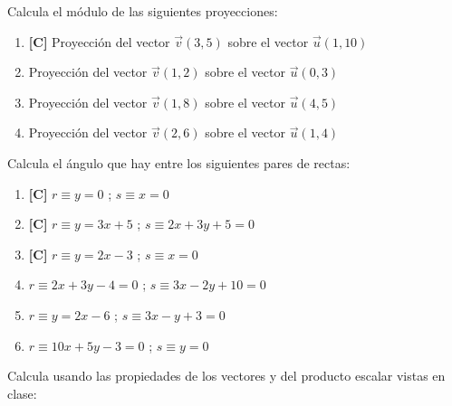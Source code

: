 \Exercicio Calcula el módulo de las siguientes proyecciones:

\begin{enumerate}[topsep=0pt]
	\item \textbf{[C]} Proyección del vector $\overrightarrow{v}(3,5)$ sobre el vector $\overrightarrow{u}(1,10)$
	\item Proyección del vector $\overrightarrow{v}(1,2)$ sobre el vector $\overrightarrow{u}(0,3)$
	\item Proyección del vector $\overrightarrow{v}(1,8)$ sobre el vector $\overrightarrow{u}(4,5)$
	\item Proyección del vector $\overrightarrow{v}(2,6)$ sobre el vector $\overrightarrow{u}(1,4)$
\end{enumerate}


\Exercicio Calcula el ángulo que hay entre los siguientes pares de rectas:

\begin{enumerate}[topsep=0pt]
	\item \textbf{[C]} $ r \equiv y = 0 $ ; $ s \equiv x = 0 $
	\item \textbf{[C]} $ r \equiv y = 3x + 5  $ ; $ s \equiv 2x + 3y +5 = 0 $
	\item \textbf{[C]} $ r \equiv y = 2x - 3  $ ; $ s \equiv x = 0 $
	
	\item $ r \equiv 2x + 3y - 4 = 0 $ ; $ s \equiv 3x - 2y + 10 = 0$
	\item $ r \equiv y = 2x - 6 $ ; $s \equiv 3x - y + 3 = 0 $
	\item $ r \equiv 10x +5y -3 = 0$ ; $ s \equiv y = 0 $
\end{enumerate}


\Exercicio Calcula usando las propiedades de los vectores y del producto escalar vistas en clase:

